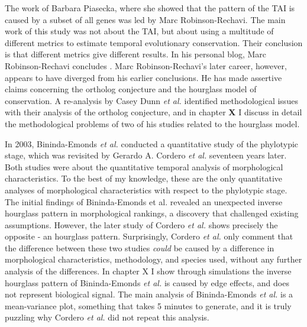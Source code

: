 The work of Barbara Piasecka, where she showed that the pattern of the TAI is caused by a subset of all genes was led by Marc Robinson-Rechavi. The main work of this study was not about the TAI, but about using a multitude of different metrics to estimate temporal evolutionary conservation. Their conclusion is that different metrics give different results. In his personal blog, Marc Robinson-Rechavi concludes \cite{robinsonrechaviblog}. Marc Robinson-Rechavi's later career, however, appears to have diverged from his earlier conclusions. He has made assertive claims concerning the ortholog conjecture\cite{KryuchkovaMostacci2016} and the hourglass model of conservation\cite{Liu2020,Liu2021,marletaz2018}. A re-analysis by Casey Dunn \textit{et al.} identified methodological issues with their analysis of the ortholog conjecture\cite{Dunn2018}, and in chapter \textbf{X} I discuss in detail the methodological problems of two of his studies related to the hourglass model.

In 2003, Bininda-Emonds \textit{et al.} conducted a quantitative study of the phylotypic stage, which was revisited by Gerardo A. Cordero \textit{et al.} seventeen years later\cite{OlafRP2003, Cordero2020}. Both studies were about the quantitative temporal analysis of morphological characteristics. To the best of my knowledge, these are the only quantitative analyses of morphological characteristics with respect to the phylotypic stage. The initial findings of Bininda-Emonds et al. revealed an unexpected inverse hourglass pattern in morphological rankings, a discovery that challenged existing assumptions. However, the later study of Cordero \textit{et al.} shows precisely the opposite - an hourglass pattern. Surprisingly, Cordero \textit{et al.} only comment that the difference between these two studies \textit{could} be caused by a difference in morphological characteristics, methodology, and species used, without any further analysis of the differences. In chapter X I show through simulations the inverse hourglass pattern of Bininda-Emonds \textit{et al.} is caused by edge effects, and does not represent biological signal. The main analysis of Bininda-Emonds \textit{et al.} is a mean-variance plot, something that takes 5 minutes to generate, and it is truly puzzling why Cordero \textit{et al.} did not repeat this analysis. 

